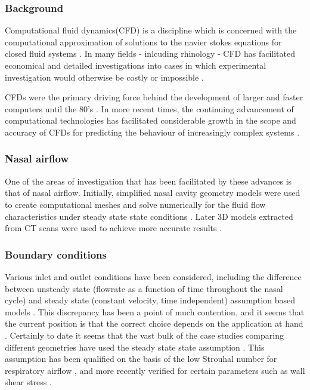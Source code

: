 \subsubsection*{Background}
Computational fluid dynamics(CFD) is a discipline which is concerned with the computational approximation of solutions to the navier stokes equations for closed fluid systems \cite{Tu2008}. In many fields - inlcuding rhinology - CFD has facilitated economical and detailed investigations into cases in which experimental investigation would otherwise be costly or impossible \cite{Keyhani1995}.

CFDs were the primary driving force behind the development of larger and faster computers until the 80's \cite{Wendt2009}. In more recent times, the continuing advancement of computational technologies has facilitated considerable growth in the scope and accuracy of CFDs for predicting the behaviour of increasingly complex systems \cite{Tu2008}. 


\subsubsection*{Nasal airflow}
One of the areas of investigation that has been facilitated by these advances is that of nasal airflow. Initially, simplified nasal cavity geometry models were used to create computational meshes and solve numerically for the fluid flow characteristics under steady state state conditions \cite{Keyhani1995, Hahn1993}. Later 3D models extracted from CT scans were used to achieve more accurate results \cite{Martonen2002}. 

\subsubsection*{Boundary conditions}
Various inlet and outlet conditions have been considered, including the difference between unsteady state  (flowrate as a function of time throughout the nasal cycle) \cite{Shi2006} and steady state (constant velocity, time independent) assumption based models \cite{Wen2008}. This discrepancy has been a point of much contention, and it seems that the current position is that the correct choice depends on the application at hand \cite{Doorly2008c}. Certainly to date it seems that the vast bulk of the case studies comparing different geometries have used the steady state state assumption \cite{Xi2012, Zhu2011, Garcia2007, Doorly2008c, Keyhani1995, Subramaniam1998, Wen2008}. This assumption has been qualified on the basis of the low Strouhal number for respiratory airflow \cite{Keyhani1995}, and more recently verified for certain parameters such as wall shear stress \cite{Doorly2008c}.


